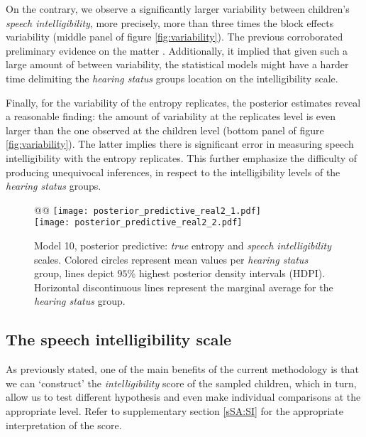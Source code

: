 On the contrary, we observe a significantly larger variability between children's \textit{speech intelligibility}, more precisely, more than three times the block effects variability (middle panel of figure \ref{fig:variability}). The previous corroborated preliminary evidence on the matter \cite{Young_et_al_2002, Peng_et_al_2004, Montag_et_al_2014, Castellanos_et_al_2014, Yanbay_et_al_2014, Nittrouer_et_al_2014, Freeman_et_al_2017, Boonen_et_al_2021}. Additionally, it implied that given such a large amount of between variability, the statistical models might have a harder time delimiting the \textit{hearing status} groups location on the intelligibility scale.

Finally, for the variability of the entropy replicates, the posterior estimates reveal a reasonable finding: the amount of variability at the replicates level is even larger than the one observed at the children level (bottom panel of figure \ref{fig:variability}). The latter implies there is significant error in measuring speech intelligibility with the entropy replicates. This further emphasize the difficulty of producing unequivocal  inferences, in respect to the intelligibility levels of the \textit{hearing status} groups.
%
%
\begin{figure}[!h]
	\centering
	\begin{tabular}{@{}@{}}
	\texttt{[image: posterior\_predictive\_real2\_1.pdf]} \\
	\texttt{[image: posterior\_predictive\_real2\_2.pdf]}
	\end{tabular}
	\caption[Model 10, posterior predictive: \textit{true} entropy and \textit{speech intelligibility} scales]{Model 10, posterior predictive: \textit{true} entropy and \textit{speech intelligibility} scales. Colored circles represent mean values per \textit{hearing status} group, lines depict $95\%$ highest posterior density intervals (HDPI). Horizontal discontinuous lines represent the marginal average for the \textit{hearing status} group.}
	\label{fig:predictive2}
\end{figure}
%
%
\subsection{The speech intelligibility scale} \label{sS:results_scales}
%
As previously stated, one of the main benefits of the current methodology is that we can `construct' the \textit{intelligibility} score of the sampled children, which in turn, allow us to test different hypothesis and even make individual comparisons at the appropriate level. Refer to supplementary section \ref{sSA:SI} for the appropriate interpretation of the score.

